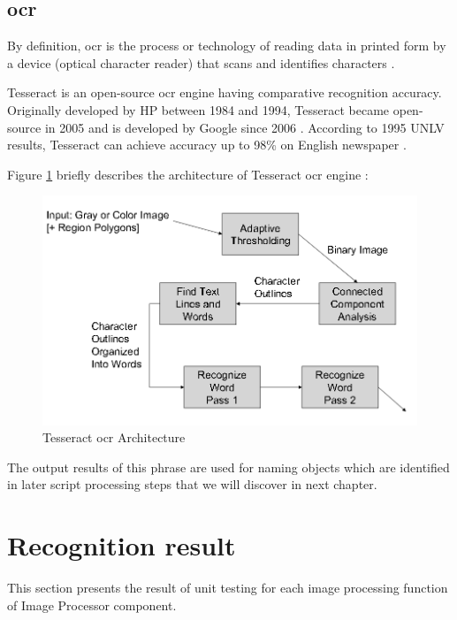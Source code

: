 \subsection{\acrlong{ocr}}
\label{sec:ocr}
By definition, \acrfull{ocr} is the process or technology of reading data in printed form by a device (optical character reader) that scans and identifies characters \cite{ocr_def}.

Tesseract is an open-source \acrshort{ocr} engine having comparative recognition accuracy. Originally developed by HP between 1984 and 1994, Tesseract became open-source in 2005 and is developed by Google since 2006 \cite{ocr_overview}. According to 1995 UNLV results, Tesseract can achieve accuracy up to 98\% on English newspaper \cite{Rice_thefourth}.

Figure \ref{fig:tesseract_arch} briefly describes the architecture of Tesseract \acrshort{ocr} engine \cite{tesseract_oscon}:

	\begin{figure}[H]
		\centering
		\includegraphics[scale=0.5]{Chapters/Fig/tesseract_arch.png}
		\caption{Tesseract \acrshort{ocr} Architecture}
		\label{fig:tesseract_arch}
	\end{figure}

The output results of this phrase are used for naming objects which are identified in later script processing steps that we will discover in next chapter.

\section{Recognition result}
This section presents the result of unit testing for each image processing function of Image Processor component.

